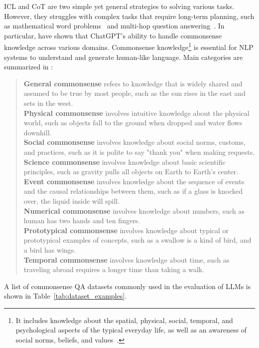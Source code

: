 ICL and CoT are two simple yet general strategies to solving various tasks.
However, they struggles with complex tasks that require long-term planning, such as mathematical word problems~\cite{qian2022limitations} and multi-hop question answering~\cite{bian2024chatgpt}.
In particular, \textcite{bian2024chatgpt} have shown that ChatGPT's ability to handle commonsense knowledge across various domains.
Commonsense knowledge\footnote{It includes knowledge about the spatial,
	physical, social, temporal, and psychological aspects of the typical everyday life, as well as an awareness of social norms, beliefs, and values~\cite{liu2004conceptnet}.} is essential for NLP systems to understand and generate human-like language.
Main categories are summarized in \textcite{bian2024chatgpt}:
\begin{quote}
	\textbf{General commonsense} refers to knowledge that is widely shared and assumed to be true by most people, such as the sun rises in the east and sets in the west.\\
	\textbf{Physical commonsense} involves intuitive knowledge about the physical world, such as objects fall to the ground when dropped and water flows downhill.\\
	\textbf{Social commonsense} involves knowledge about social norms, customs, and practices, such as it is polite to say "thank you" when
	making requests.\\
	\textbf{Science commonsense} involves knowledge about basic scientific principles, such as gravity pulls all objects on Earth to Earth’s center.\\
	\textbf{Event commonsense} involves knowledge about the sequence of events and the causal relationships between them, such as if a glass is knocked over, the liquid inside will spill.\\
	\textbf{Numerical commonsense} involves knowledge about numbers, such as human has two hands and ten fingers.\\
	\textbf{Prototypical commonsense} involves knowledge about typical or prototypical examples of concepts, such as a swallow is a kind of bird, and a bird has wings.\\
	\textbf{Temporal commonsense} involves knowledge about time, such as traveling abroad requires a longer time than taking a walk.
\end{quote}
A list of commonsense QA datasets commonly used in the evaluation of LLMs is shown in Table~\ref{tab:dataset_examples}.
